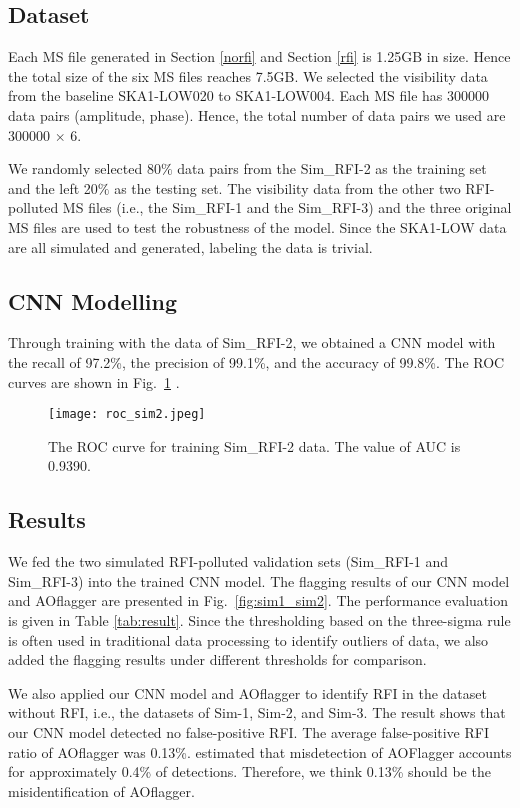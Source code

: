 \documentclass[usenatbib]{mnras}
\begin{document}
\subsection{Dataset}

Each MS file generated in Section \ref{norfi} and Section \ref{rfi} is 1.25GB in size. Hence the total size of the six MS files reaches 7.5GB. We selected the visibility data from the baseline SKA1-LOW020 to SKA1-LOW004. Each MS file has 300000 data pairs (amplitude, phase). Hence, the total number of data pairs we used are 300000 $\times$ 6.

We randomly selected 80$\%$  data pairs from the Sim\_RFI-2 as the training set and the left 20$\%$  as the testing set. The visibility data from the other two RFI-polluted MS files (i.e., the Sim\_RFI-1 and the Sim\_RFI-3) and the three original MS files are used to test the robustness of the model. Since the SKA1-LOW data are all simulated and generated, labeling the data is trivial.

\subsection{CNN Modelling}
Through training with the data of Sim\_RFI-2, we obtained a CNN model with the recall of 97.2\%, the precision of 99.1\%, and the accuracy of 99.8\%. The ROC curves are shown in Fig.~\ref{fig:ROC} .

\begin{figure}
    \centering
    \texttt{[image: roc\_sim2.jpeg]}
    \caption{The ROC curve for training Sim\_RFI-2 data. The value of AUC is 0.9390.}
    \label{fig:ROC}
\end{figure}

\subsection{Results}

We fed the two simulated RFI-polluted validation sets (Sim\_RFI-1 and Sim\_RFI-3) into the trained CNN model. The flagging results of our CNN model and AOflagger are presented in Fig.~\ref{fig:sim1_sim2}. The performance evaluation is given in Table \ref{tab:result}. Since the thresholding based on the three-sigma rule \citep{pukelsheim1994three} is often used in traditional data processing to identify outliers of data, we also added the flagging results under different thresholds for comparison. 

We also applied our CNN model and AOflagger to identify RFI in the dataset without RFI, i.e., the datasets of Sim-1, Sim-2, and Sim-3. The result shows that our CNN model detected no false-positive RFI. The average false-positive RFI ratio of AOflagger was 0.13\%. \citep{offringa2013lofar} estimated that misdetection of AOFlagger accounts for approximately 0.4\% of detections. Therefore, we think 0.13\% should be the misidentification of AOflagger.
\end{document}
